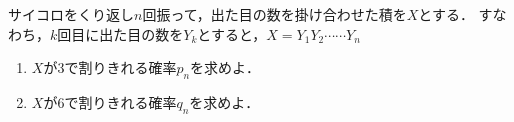 \documentclass[../../main.tex]{subfiles}
\begin{document}
サイコロをくり返し$n$回振って，出た目の数を掛け合わせた積を$X$とする．
すなわち，$k$回目に出た目の数を$Y_k$とすると，$X=Y_1Y_2\cdots\cdots Y_n$
\begin{enumerate}
  \item $X$が3で割りきれる確率$p_n$を求めよ．
  \item $X$が6で割りきれる確率$q_n$を求めよ．
\end{enumerate}
\end{document}
